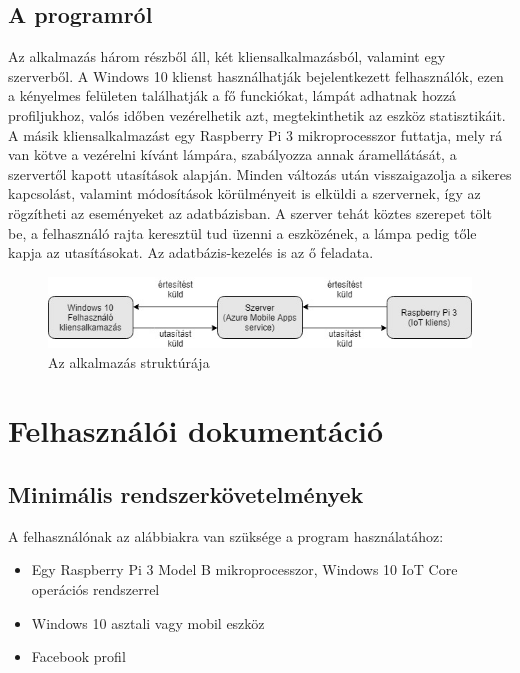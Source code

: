 \documentclass[a4paper,12pt]{report}
\begin{document}
    \section{A programról}
    Az alkalmazás három részből áll, két kliensalkalmazásból, valamint egy szerverből. A Windows 10 klienst használhatják
    bejelentkezett felhasználók, ezen a kényelmes felületen találhatják a fő funckiókat, lámpát adhatnak hozzá profiljukhoz, valós időben
    vezérelhetik azt, megtekinthetik az eszköz statisztikáit. A másik kliensalkalmazást egy Raspberry Pi 3 mikroprocesszor futtatja, mely
    rá van kötve a vezérelni kívánt lámpára, szabályozza annak áramellátását, a szervertől kapott utasítások alapján. Minden változás után
    visszaigazolja a sikeres kapcsolást, valamint módosítások körülményeit is elküldi a szervernek, így az rögzítheti az eseményeket az
    adatbázisban. A szerver tehát köztes szerepet tölt be, a felhasználó rajta keresztül tud üzenni a eszközének, a lámpa pedig tőle
    kapja az utasításokat. Az adatbázis-kezelés is az ő feladata.

    \begin{figure}[h!]
        \includegraphics[width=\linewidth]{images/application_diagram.jpg}
        \caption{Az alkalmazás struktúrája}
        \label{fig: Az alkalmazás struktúrája}
    \end{figure}

    \chapter{Felhasználói dokumentáció}

    \section{Minimális rendszerkövetelmények}
    A felhasználónak az alábbiakra van szüksége a program használatához:

    \begin{itemize}
        \item Egy Raspberry Pi 3 Model B mikroprocesszor, Windows 10 IoT Core operációs rendszerrel
        \item Windows 10 asztali vagy mobil eszköz
        \item Facebook profil
    \end{itemize}
\end{document}
